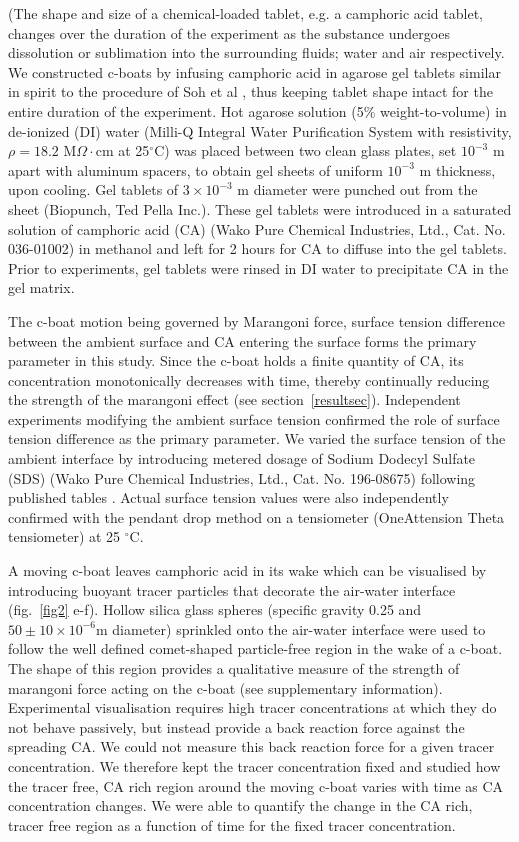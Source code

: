 \documentclass[journal=langd5, manuscript=article, layout=twocolumn]{achemso}
\begin{document}
(The shape and size of a chemical-loaded tablet, e.g. a camphoric acid tablet, changes over the duration of the experiment as the substance undergoes dissolution or sublimation into the surrounding fluids; water and air respectively. We constructed c-boats by infusing camphoric acid in agarose gel tablets similar in spirit to the procedure of Soh et al \cite{Soh2008}, thus keeping tablet shape intact for the entire duration of the experiment. Hot agarose solution (5\% weight-to-volume) in de-ionized (DI) water (Milli-Q Integral Water Purification System with resistivity, $\rho=18.2$ M$\Omega\cdot$cm at 25$^{\circ}$C) was placed between two clean glass plates, set $10^{-3}$ m apart with aluminum spacers, to obtain gel sheets of uniform $10^{-3}$ m thickness, upon cooling. Gel tablets of $3 \times 10^{-3}$ m diameter were punched out from the sheet (Biopunch, Ted Pella Inc.). These gel tablets were introduced in a saturated solution of camphoric acid (CA) (Wako Pure Chemical Industries, Ltd., Cat. No. 036-01002) in methanol and left for 2 hours for CA to diffuse into the gel tablets. Prior to experiments, gel tablets were rinsed in DI water to precipitate CA in the gel matrix. 

The c-boat motion being governed by Marangoni force, surface tension difference between the ambient surface and CA entering the surface forms the primary parameter in this study. Since the c-boat holds a finite quantity of CA, its concentration monotonically decreases with time, thereby continually reducing the strength of the marangoni effect (see section~\ref{resultsec}). Independent experiments modifying the ambient surface tension confirmed the role of surface tension difference as the primary parameter. We varied the surface tension of the ambient interface by introducing metered dosage of Sodium Dodecyl Sulfate (SDS) (Wako Pure Chemical Industries, Ltd., Cat. No. 196-08675) following published tables \cite{Mysels1986}. Actual surface tension values were also independently confirmed with the pendant drop method on a tensiometer (OneAttension Theta tensiometer) at 25 $^{\circ}$C.


A moving c-boat leaves camphoric acid in its wake which can be visualised by introducing buoyant tracer particles that decorate the air-water interface (fig.~\ref{fig2} e-f). Hollow silica glass spheres (specific gravity 0.25 and $50 \pm 10 \times 10^{-6}$m diameter) sprinkled onto the air-water interface were used to follow the well defined comet-shaped particle-free region in the wake of a c-boat. The shape of this region provides a qualitative measure of the strength of marangoni force acting on the c-boat (see supplementary information). Experimental visualisation requires high tracer concentrations at which they do not behave passively, but instead provide a back reaction force against the spreading CA. We could not measure this back reaction force for a given tracer concentration. We therefore kept the tracer concentration fixed and studied how the tracer free, CA rich region around the moving c-boat varies with time as CA concentration changes. We were able to quantify the change in the CA rich, tracer free region as a function of time for the fixed tracer concentration.
\end{document}

